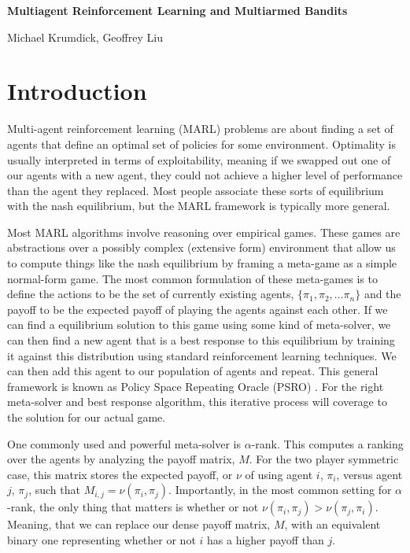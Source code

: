 \documentclass{article}
\begin{document}
\noindent \large\textbf{Multiagent Reinforcement Learning and Multiarmed Bandits}

\noindent \large Michael Krumdick, Geoffrey Liu

\section{Introduction}

Multi-agent reinforcement learning (MARL) problems are about finding a set of
agents that define an optimal set of policies for some environment. Optimality is usually
interpreted in terms of exploitability, meaning if we swapped out one of our
agents with a new agent, they could not achieve a higher level of performance than
the agent they replaced. Most people associate these sorts of equilibrium with the
nash equilibrium, but the MARL framework is typically more general.

Most MARL algorithms involve reasoning over empirical games. These games are
abstractions over a possibly complex (extensive form) environment that allow us
to compute things like the nash equilibrium by framing a meta-game as a simple
normal-form game.  The most common formulation of these meta-games is to define
the actions to be the set of currently existing agents, $\{\pi_1, \pi_2, \dots
\pi_n\}$ and the payoff to be the expected payoff of playing the agents against
each other. If we can find a equilibrium solution to this game using some kind
of meta-solver, we can then find a new agent that is a best response to this
equilibrium by training it against this distribution using standard
reinforcement learning techniques. We can then add this agent to our population
of agents and repeat.  This general framework is known as Policy Space Repeating
Oracle (PSRO) \cite{PSRO}. For the right meta-solver and best response
algorithm, this iterative process will coverage to the solution for our actual
game.

One commonly used and powerful meta-solver is $\alpha$-rank. \cite{alpha} 
This computes a ranking over the agents by analyzing the payoff matrix, $M$.
For the two player symmetric case, this matrix stores the expected payoff, or
$\nu$ of using agent $i$, $\pi_i$, versus agent $j$, $\pi_j$, such
that $M_{i, j} = \nu(\pi_i, \pi_j)$. Importantly, in the most common setting for
$\alpha$-rank, the only thing that matters is whether or not $\nu(\pi_i, \pi_j)
> \nu(\pi_j, \pi_i)$. Meaning, that we can replace our dense payoff matrix, $M$,
with an equivalent binary one representing whether or not $i$ has a higher
payoff than $j$.
\end{document}
